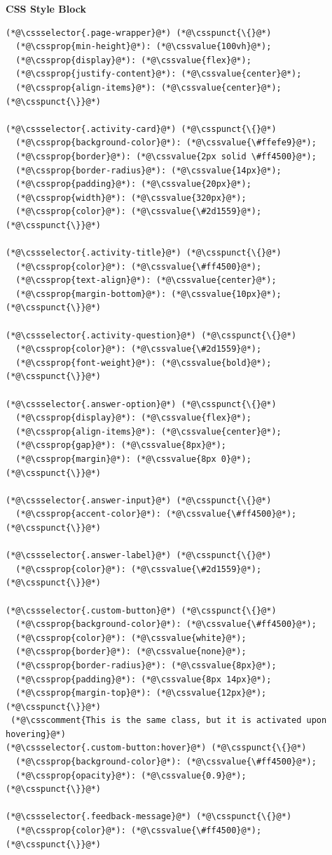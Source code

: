\documentclass{article}
\begin{document}
\hfill
\begin{minipage}[t]{0.48\textwidth}
  \textbf{\Bitter\textcolor{naranja}{CSS Style Block}}

  \vspace{0.15cm}

  \begin{lstlisting}
(*@\cssselector{.page-wrapper}@*) (*@\csspunct{\{}@*)
  (*@\cssprop{min-height}@*): (*@\cssvalue{100vh}@*);
  (*@\cssprop{display}@*): (*@\cssvalue{flex}@*);
  (*@\cssprop{justify-content}@*): (*@\cssvalue{center}@*);
  (*@\cssprop{align-items}@*): (*@\cssvalue{center}@*);
(*@\csspunct{\}}@*)

(*@\cssselector{.activity-card}@*) (*@\csspunct{\{}@*)
  (*@\cssprop{background-color}@*): (*@\cssvalue{\#ffefe9}@*);
  (*@\cssprop{border}@*): (*@\cssvalue{2px solid \#ff4500}@*);
  (*@\cssprop{border-radius}@*): (*@\cssvalue{14px}@*);
  (*@\cssprop{padding}@*): (*@\cssvalue{20px}@*);
  (*@\cssprop{width}@*): (*@\cssvalue{320px}@*);
  (*@\cssprop{color}@*): (*@\cssvalue{\#2d1559}@*);
(*@\csspunct{\}}@*)

(*@\cssselector{.activity-title}@*) (*@\csspunct{\{}@*)
  (*@\cssprop{color}@*): (*@\cssvalue{\#ff4500}@*);
  (*@\cssprop{text-align}@*): (*@\cssvalue{center}@*);
  (*@\cssprop{margin-bottom}@*): (*@\cssvalue{10px}@*);
(*@\csspunct{\}}@*)

(*@\cssselector{.activity-question}@*) (*@\csspunct{\{}@*)
  (*@\cssprop{color}@*): (*@\cssvalue{\#2d1559}@*);
  (*@\cssprop{font-weight}@*): (*@\cssvalue{bold}@*);
(*@\csspunct{\}}@*)

(*@\cssselector{.answer-option}@*) (*@\csspunct{\{}@*)
  (*@\cssprop{display}@*): (*@\cssvalue{flex}@*);
  (*@\cssprop{align-items}@*): (*@\cssvalue{center}@*);
  (*@\cssprop{gap}@*): (*@\cssvalue{8px}@*);
  (*@\cssprop{margin}@*): (*@\cssvalue{8px 0}@*);
(*@\csspunct{\}}@*)

(*@\cssselector{.answer-input}@*) (*@\csspunct{\{}@*)
  (*@\cssprop{accent-color}@*): (*@\cssvalue{\#ff4500}@*);
(*@\csspunct{\}}@*)

(*@\cssselector{.answer-label}@*) (*@\csspunct{\{}@*)
  (*@\cssprop{color}@*): (*@\cssvalue{\#2d1559}@*);
(*@\csspunct{\}}@*)

(*@\cssselector{.custom-button}@*) (*@\csspunct{\{}@*)
  (*@\cssprop{background-color}@*): (*@\cssvalue{\#ff4500}@*);
  (*@\cssprop{color}@*): (*@\cssvalue{white}@*);
  (*@\cssprop{border}@*): (*@\cssvalue{none}@*);
  (*@\cssprop{border-radius}@*): (*@\cssvalue{8px}@*);
  (*@\cssprop{padding}@*): (*@\cssvalue{8px 14px}@*);
  (*@\cssprop{margin-top}@*): (*@\cssvalue{12px}@*);
(*@\csspunct{\}}@*)
 (*@\csscomment{This is the same class, but it is activated upon hovering}@*)
(*@\cssselector{.custom-button:hover}@*) (*@\csspunct{\{}@*)
  (*@\cssprop{background-color}@*): (*@\cssvalue{\#ff4500}@*);
  (*@\cssprop{opacity}@*): (*@\cssvalue{0.9}@*);
(*@\csspunct{\}}@*)

(*@\cssselector{.feedback-message}@*) (*@\csspunct{\{}@*)
  (*@\cssprop{color}@*): (*@\cssvalue{\#ff4500}@*);
(*@\csspunct{\}}@*)
\end{lstlisting}

\end{minipage}
\end{document}
